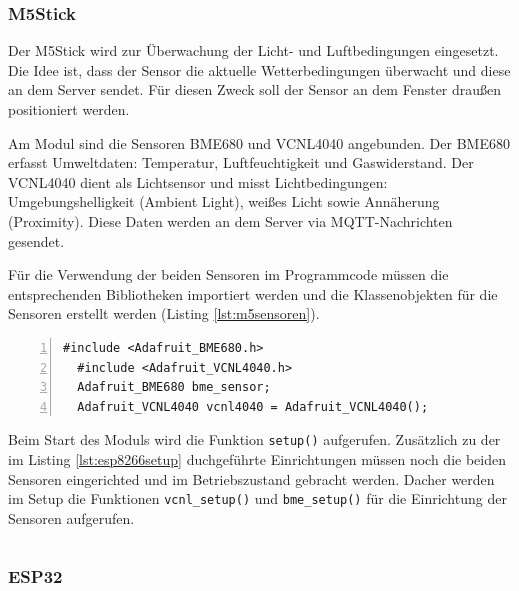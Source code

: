 \documentclass[12pt, letterpaper]{article}
\begin{document}
  
  \subsubsection{M5Stick}
  \par Der M5Stick wird zur Überwachung der Licht- und Luftbedingungen eingesetzt. Die Idee ist, dass der Sensor die aktuelle Wetterbedingungen überwacht und diese an dem Server sendet. Für diesen Zweck soll der Sensor an dem Fenster draußen positioniert werden.
  \par Am Modul sind die Sensoren BME680 und VCNL4040 angebunden. Der BME680 erfasst Umweltdaten: Temperatur, Luftfeuchtigkeit und Gaswiderstand. Der VCNL4040 dient als Lichtsensor und misst Lichtbedingungen: Umgebungshelligkeit (Ambient Light), weißes Licht sowie Annäherung (Proximity). Diese Daten werden an dem Server via MQTT-Nachrichten gesendet.
  \par Für die Verwendung der beiden Sensoren im Programmcode müssen die entsprechenden Bibliotheken importiert werden und die Klassenobjekten für die Sensoren erstellt werden (Listing \ref{lst:m5sensoren}). 
\begin{lstlisting}[frame=single, style=cpp, numbers=left, label={lst:m5sensoren}, caption={M5Stick: Sensoren}]
  #include <Adafruit_BME680.h>
  #include <Adafruit_VCNL4040.h>
  Adafruit_BME680 bme_sensor;
  Adafruit_VCNL4040 vcnl4040 = Adafruit_VCNL4040();
\end{lstlisting}

\par Beim Start des Moduls wird die Funktion \texttt{setup()} aufgerufen. Zusätzlich zu der im Listing \ref{lst:esp8266setup} duchgeführte Einrichtungen müssen noch die beiden Sensoren eingerichted und im Betriebszustand gebracht werden. Dacher werden im Setup die Funktionen \texttt{vcnl\_setup()} und \texttt{bme\_setup()} für die Einrichtung der Sensoren aufgerufen.

\begin{lstlisting}[frame=single, style=cpp, numbers=left, label={lst:m5vcnlsetup}, caption={M5Stick: vcnl\_setup}]

\end{lstlisting}

\subsubsection{ESP32}
\end{document}
